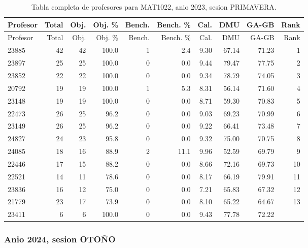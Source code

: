 \begingroup
\scriptsize
\setlength{\tabcolsep}{3pt}
\begin{longtable}{lrrrrrrrrr}
\caption{Tabla completa de profesores para MAT1022, anio 2023, sesion PRIMAVERA.}\label{tab:prof-period-mat1022-2023-primavera-especializado}\\
\toprule
Profesor & Total & Obj. & Obj. \% & Bench. & Bench. \% & Cal. & DMU & GA-GB & Rank \\
\midrule
\endfirsthead
\toprule
Profesor & Total & Obj. & Obj. \% & Bench. & Bench. \% & Cal. & DMU & GA-GB & Rank \\
\midrule
\endhead
23885 & 42 & 42 & 100.0 & 1 & 2.4 & 9.30 & 67.14 & 71.23 & 1 \\
23897 & 25 & 25 & 100.0 & 0 & 0.0 & 9.44 & 79.47 & 77.75 & 2 \\
23852 & 22 & 22 & 100.0 & 0 & 0.0 & 9.34 & 78.79 & 74.05 & 3 \\
20792 & 19 & 19 & 100.0 & 1 & 5.3 & 8.31 & 56.14 & 71.60 & 4 \\
23148 & 19 & 19 & 100.0 & 0 & 0.0 & 8.71 & 59.30 & 70.83 & 5 \\
22473 & 26 & 25 & 96.2 & 0 & 0.0 & 9.03 & 69.23 & 70.99 & 6 \\
23149 & 26 & 25 & 96.2 & 0 & 0.0 & 9.22 & 66.41 & 73.48 & 7 \\
24827 & 24 & 23 & 95.8 & 0 & 0.0 & 9.32 & 75.00 & 70.75 & 8 \\
24085 & 18 & 16 & 88.9 & 2 & 11.1 & 9.96 & 52.59 & 69.79 & 9 \\
22446 & 17 & 15 & 88.2 & 0 & 0.0 & 8.66 & 72.16 & 69.73 & 10 \\
22521 & 14 & 11 & 78.6 & 0 & 0.0 & 8.17 & 66.19 & 79.91 & 11 \\
23836 & 16 & 12 & 75.0 & 0 & 0.0 & 7.21 & 65.83 & 67.32 & 12 \\
21779 & 23 & 17 & 73.9 & 0 & 0.0 & 8.10 & 65.22 & 64.67 & 13 \\
23411 & 6 & 6 & 100.0 & 0 & 0.0 & 9.43 & 77.78 & 72.22 &  \\
\bottomrule
\end{longtable}
\endgroup

\subsubsection{Anio 2024, sesion OTOÑO}

